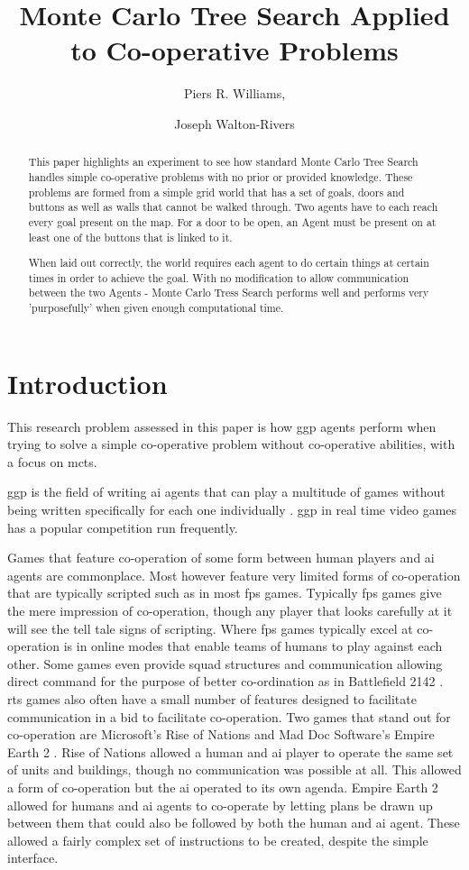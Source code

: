 \documentclass{IEEEtran}
\author{Piers R. Williams, \and Joseph Walton-Rivers}
\title{Monte Carlo Tree Search Applied to Co-operative Problems}
\begin{document}
\maketitle
\begin{abstract}
This paper highlights an experiment to see how standard Monte Carlo Tree Search handles simple co-operative problems with no prior or provided knowledge. These problems are formed from a simple grid world that has a set of goals, doors and buttons as well as walls that cannot be walked through. Two agents have to each reach every goal present on the map. For a door to be open, an Agent must be present on at least one of the buttons that is linked to it.

When laid out correctly, the world requires each agent to do certain things at certain times in order to achieve the goal. With no modification to allow communication between the two Agents - Monte Carlo Tress Search performs well and performs very 'purposefully' when given enough computational time.
\end{abstract}

\section{Introduction}
This research problem assessed in this paper is how \gls{ggp} agents perform when trying to solve a simple co-operative problem without co-operative abilities, with a focus on \gls{mcts}.

\gls{ggp} is the field of writing \gls{ai} agents that can play a multitude of games without being written specifically for each one individually \cite{genesereth2005general}. \gls{ggp} in real time video games has a popular competition \cite{perez2014} run frequently.

Games that feature co-operation of some form between human players and \gls{ai} agents are commonplace. Most however feature very limited forms of co-operation that are typically scripted such as in most \gls{fps} games. Typically \gls{fps} games give the mere impression of co-operation, though any player that looks carefully at it will see the tell tale signs of scripting. Where \gls{fps} games typically excel at co-operation is in online modes that enable teams of humans to play against each other. Some games even provide squad structures and communication allowing direct command for the purpose of better co-ordination as in Battlefield 2142 \cite{battlefield2142}. \gls{rts} games also often have a small number of features designed to facilitate communication in a bid to facilitate co-operation. Two games that stand out for co-operation are Microsoft's Rise of Nations \cite{riseofnations} and Mad Doc Software's Empire Earth 2 \cite{empireEarth2}. Rise of Nations allowed a human and \gls{ai} player to operate the same set of units and buildings, though no communication was possible at all. This allowed a form of co-operation but the \gls{ai} operated to its own agenda. Empire Earth 2 allowed for humans and \gls{ai} agents to co-operate by letting plans be drawn up between them that could also be followed by both the human and \gls{ai} agent. These allowed a fairly complex set of instructions to be created, despite the simple interface. 
\end{document}
